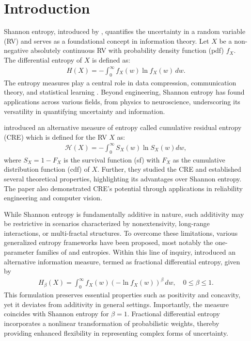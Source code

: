 \documentclass[12pt,a4paper]{article}
\numberwithin{equation}{section}
\begin{document}
	\thispagestyle{empty}
	\section{Introduction}
Shannon entropy, introduced by \cite{Sh1948}, quantifies the uncertainty in a random variable (RV) and serves as a foundational concept in information theory. Let $X$ be a non-negative absolutely continuous RV with probability density function (pdf)
$f_X$. The  differential entropy of $X$ is defined as:
\begin{align}
H(X) = -\int_0^\infty f_X(w)\ln f_X(w)\,dw.
\end{align}
The entropy measures play a central role in data compression, communication theory, and statistical learning \citep{Mac2003}. Beyond engineering, Shannon entropy has found applications across various fields, from physics to neuroscience, underscoring its versatility in quantifying uncertainty and information. 

\cite{Rao2004} introduced an alternative measure of entropy called cumulative residual entropy (CRE) which is defined for the RV $X$ as:
 \begin{align}\label{eq:1.2}
\mathcal {H}(X)=-\int_0^{\infty}S_X (w)\ln {S_X}(w)dw,
 \end{align}
where $S_X=1-F_X$ is the survival function ({sf}) with $F_X$ as the cumulative distribution function (cdf) of $X$. Further, they studied the CRE and  established several theoretical properties, highlighting its advantages over Shannon entropy. The paper also demonstrated CRE's potential through applications in reliability engineering and computer vision.

While Shannon entropy is fundamentally additive in nature, such additivity may be restrictive in scenarios characterized by nonextensivity, long-range interactions, or multi-fractal structures. To overcome these limitations, various generalized entropy frameworks have been proposed, most notably the one-parameter families of \cite{Tsa1988} and \cite{Ren1961} entropies. Within this line of inquiry, \cite{Ubri2009} introduced an alternative information measure, termed as fractional differential entropy, given by
\begin{align}\label{eq:1.3}
 H_\beta(X) = \int_0^\infty f_X(w)\left(-\ln f_X(w)\right)^\beta\,dw, \quad 0 \leq \beta \leq 1.
\end{align}
This formulation preserves essential properties such as positivity and concavity, yet it deviates from additivity in general settings. Importantly, the measure coincides with Shannon entropy for $\beta=1$. Fractional differential entropy incorporates a nonlinear transformation of probabilistic weights, thereby providing enhanced flexibility in representing complex forms of uncertainty. 
\end{document}
